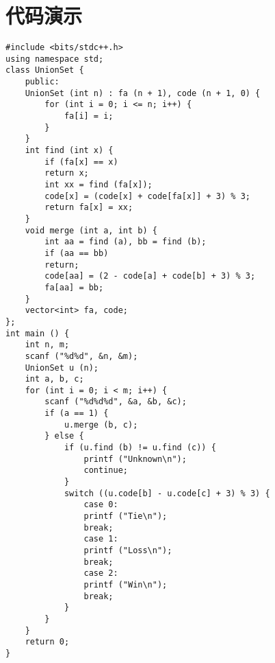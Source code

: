 \documentclass{note}
\begin{document}
\section{代码演示}
\begin{lstlisting}[style=C++,caption={HZOJ-72}]
#include <bits/stdc++.h>
using namespace std;
class UnionSet {
    public:
    UnionSet (int n) : fa (n + 1), code (n + 1, 0) {
        for (int i = 0; i <= n; i++) {
            fa[i] = i;
        }
    }
    int find (int x) {
        if (fa[x] == x)
        return x;
        int xx = find (fa[x]);
        code[x] = (code[x] + code[fa[x]] + 3) % 3;
        return fa[x] = xx;
    }
    void merge (int a, int b) {
        int aa = find (a), bb = find (b);
        if (aa == bb)
        return;
        code[aa] = (2 - code[a] + code[b] + 3) % 3;
        fa[aa] = bb;
    }
    vector<int> fa, code;
};
int main () {
    int n, m;
    scanf ("%d%d", &n, &m);
    UnionSet u (n);
    int a, b, c;
    for (int i = 0; i < m; i++) {
        scanf ("%d%d%d", &a, &b, &c);
        if (a == 1) {
            u.merge (b, c);
        } else {
            if (u.find (b) != u.find (c)) {
                printf ("Unknown\n");
                continue;
            }
            switch ((u.code[b] - u.code[c] + 3) % 3) {
                case 0:
                printf ("Tie\n");
                break;
                case 1:
                printf ("Loss\n");
                break;
                case 2:
                printf ("Win\n");
                break;
            }
        }
    }
    return 0;
}


\end{lstlisting}
\end{document}
